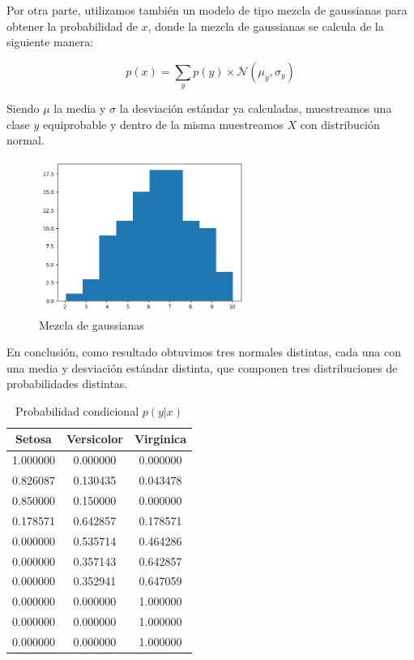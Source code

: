 \documentclass[11pt]{article}
\begin{document}
Por otra parte, utilizamos también un modelo de tipo mezcla de gaussianas para obtener la probabilidad de $x$, donde la mezcla de gaussianas se calcula de la siguiente manera:

$$
p(x) = \sum_y p(y) \times \mathcal{N}(\mu_y, \sigma_y)
$$ 

Siendo $\mu$ la media y $\sigma$ la desviación estándar ya calculadas, muestreamos una clase $y$ equiprobable y dentro de la misma muestreamos $X$ con distribución normal. 

\begin{figure}[h]
    \centering
    \includegraphics[width=0.6\textwidth]{notebooks_clase_1/mix_gaussians.png}
    \caption{Mezcla de gaussianas}
    \label{fig:mix-gaussians}
\end{figure}

En conclusión, como resultado obtuvimos tres normales distintas, cada una con una media y desviación estándar distinta, que componen tres distribuciones de probabilidades distintas.

\begin{table}[h]
\centering
\begin{tabular}{c|c|c}
\textbf{Setosa}                   & \textbf{Versicolor}               &  \textbf{Virginica} \\ \hline \hline
        1.000000 & 0.000000 & 0.000000 \\
        0.826087 & 0.130435 & 0.043478 \\
        0.850000 & 0.150000 & 0.000000 \\
        0.178571 & 0.642857 & 0.178571 \\
        0.000000 & 0.535714 & 0.464286 \\
        0.000000 & 0.357143 & 0.642857 \\
        0.000000 & 0.352941 & 0.647059 \\
        0.000000 & 0.000000 & 1.000000 \\
        0.000000 & 0.000000 & 1.000000 \\
        0.000000 & 0.000000 & 1.000000 \\
    \end{tabular}
    \caption{Probabilidad condicional $p(y|x)$}
    \label{tab:cond_yx}
\end{table}
\end{document}
